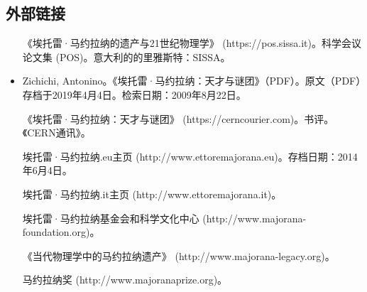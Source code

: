 \subsection{外部链接}
\begin{itemize}
\item [《埃托雷·马约拉纳的遗产与21世纪物理学》](https://pos.sissa.it)。科学会议论文集 (POS)。意大利的的里雅斯特：SISSA。
\item Zichichi, Antonino。《埃托雷·马约拉纳：天才与谜团》（PDF）。原文（PDF）存档于2019年4月4日。检索日期：2009年8月22日。
\item [《埃托雷·马约拉纳：天才与谜团》](https://cerncourier.com)。书评。《CERN通讯》。
\item [埃托雷·马约拉纳.eu主页](http://www.ettoremajorana.eu)。存档日期：2014年6月4日。
\item [埃托雷·马约拉纳.it主页](http://www.ettoremajorana.it)。
\item [埃托雷·马约拉纳基金会和科学文化中心](http://www.majorana-foundation.org)。
\item [《当代物理学中的马约拉纳遗产》](http://www.majorana-legacy.org)。
\item [马约拉纳奖](http://www.majoranaprize.org)。
\end{itemize}